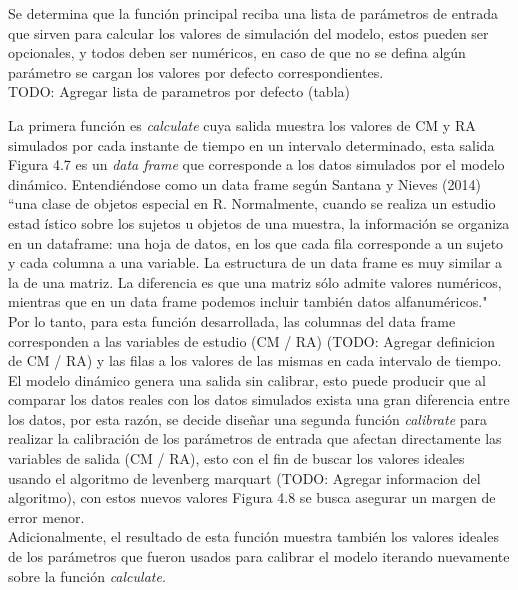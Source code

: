 Se determina que la funci\'on principal reciba una lista de par\'ametros de entrada que sirven para calcular los valores de simulaci\'on del modelo, estos pueden ser opcionales, y todos deben ser num\'ericos, en caso de que no se defina alg\'un par\'ametro se cargan los valores por defecto correspondientes.\\

TODO: Agregar lista de parametros por defecto (tabla)

La primera funci\'on es \textit{calculate} cuya salida muestra los valores de CM y RA simulados por cada instante de tiempo en un intervalo determinado, esta salida Figura 4.7 es un \textit{data frame} que corresponde a los datos simulados por el modelo din\'amico. Entendi\'endose como un data frame seg\'un Santana y Nieves (2014) “una clase de objetos especial en R. Normalmente, cuando se realiza un estudio estad \'istico sobre los sujetos u objetos de una muestra, la informaci\'on se organiza en un dataframe: una hoja de datos, en los que cada fila corresponde a un sujeto y cada columna a una variable. La estructura de un data frame es muy similar a la de una matriz. La diferencia es que una matriz s\'olo admite valores num\'ericos, mientras que en un data frame podemos incluir tambi\'en datos alfanum\'ericos."\\

Por lo tanto, para esta funci\'on desarrollada, las columnas del data frame corresponden a las variables de estudio (CM / RA) (TODO: Agregar definicion de CM / RA) y las filas a los valores de las mismas en cada intervalo de tiempo.\\

El modelo din\'amico genera una salida sin calibrar, esto puede producir que al comparar los datos reales con los datos simulados exista una gran diferencia entre los datos, por esta raz\'on, se decide diseñar una segunda funci\'on \textit{calibrate} para realizar la calibraci\'on de los par\'ametros de entrada que afectan directamente las variables de salida (CM / RA), esto con el fin de buscar los valores ideales usando el algoritmo de levenberg marquart (TODO: Agregar informacion del algoritmo), con estos nuevos valores Figura 4.8 se busca asegurar un margen de error menor.\\

Adicionalmente, el resultado de esta funci\'on muestra tambi\'en los valores ideales de los par\'ametros que fueron usados para calibrar el modelo iterando nuevamente sobre la funci\'on \textit{calculate}.\\

